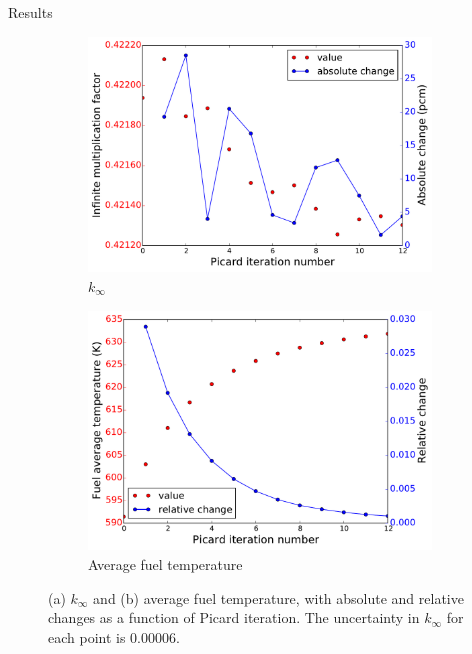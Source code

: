 \documentclass[10pt]{beamer}
\begin{document}
\begin{frame}{Results}

\begin{figure}[!htb]
\centering
\begin{subfigure}{.5\textwidth}
  \centering
  \includegraphics[width=0.9\linewidth]{../Figures/k_eff.pdf}
  \caption{\(k_{\infty}\)}
\end{subfigure}%
\begin{subfigure}{.5\textwidth}
  \centering
  \includegraphics[width=0.9\linewidth]{../Figures/temp.pdf}
  \caption{Average fuel temperature}
\end{subfigure}
\caption{(a) \(k_{\infty}\) and (b) average
fuel temperature, with absolute and relative changes as a function of Picard iteration. The uncertainty
in \(k_{\infty}\) for each point is 0.00006.}
\end{figure}

\end{frame}
\end{document}
